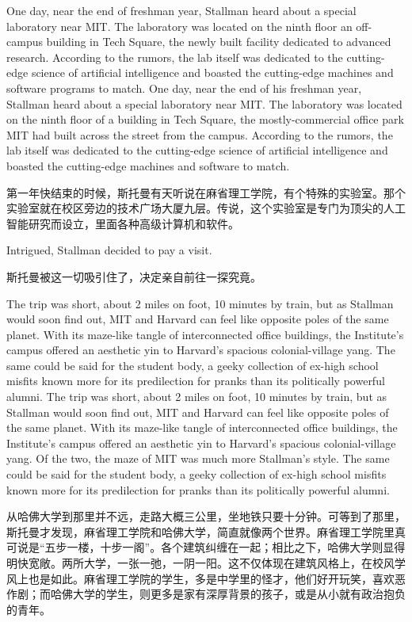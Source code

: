 \ifdefined\eng
\ifdefined\vone
One day, near the end of freshman year, Stallman heard about a special laboratory near MIT. The laboratory was located on the ninth floor an off-campus building in Tech Square, the newly built facility dedicated to advanced research. According to the rumors, the lab itself was dedicated to the cutting-edge science of artificial intelligence and boasted the cutting-edge machines and software programs to match.
\fi
\ifdefined\vtwo
One day, near the end of his freshman year, Stallman heard about a special laboratory near MIT. The laboratory was located on the ninth floor of a building in Tech Square, the mostly-commercial office park MIT had built across the street from the campus. According to the rumors, the lab itself was dedicated to the cutting-edge science of artificial intelligence and boasted the cutting-edge machines and software to match.
\fi
\fi

\ifdefined\chs
第一年快结束的时候，斯托曼有天听说在麻省理工学院，有个特殊的实验室。那个实验室就在校区旁边的技术广场大厦九层。传说，这个实验室是专门为顶尖的人工智能研究而设立，里面各种高级计算机和软件。
\fi

\ifdefined\eng
Intrigued, Stallman decided to pay a visit.
\fi

\ifdefined\chs
斯托曼被这一切吸引住了，决定亲自前往一探究竟。
\fi

\ifdefined\eng
\ifdefined\vone
The trip was short, about 2 miles on foot, 10 minutes by train, but as Stallman would soon find out, MIT and Harvard can feel like opposite poles of the same planet. With its maze-like tangle of interconnected office buildings, the Institute's campus offered an aesthetic yin to Harvard's spacious colonial-village yang. The same could be said for the student body, a geeky collection of ex-high school misfits known more for its predilection for pranks than its politically powerful alumni.
\fi
\ifdefined\vtwo
The trip was short, about 2 miles on foot, 10 minutes by train, but as Stallman would soon find out, MIT and Harvard can feel like opposite poles of the same planet. With its maze-like tangle of interconnected office buildings, the Institute's campus offered an aesthetic yin to Harvard's spacious colonial-village yang.  Of the two, the maze of MIT was much more Stallman's style. The same could be said for the student body, a geeky collection of ex-high school misfits known more for its predilection for pranks than its politically powerful alumni.
\fi
\fi

\ifdefined\chs
从哈佛大学到那里并不远，走路大概三公里，坐地铁只要十分钟。可等到了那里，斯托曼才发现，麻省理工学院和哈佛大学，简直就像两个世界。麻省理工学院里真可说是``五步一楼，十步一阁''。各个建筑纠缠在一起；相比之下，哈佛大学则显得明快宽敞。两所大学，一张一弛，一阴一阳。这不仅体现在建筑风格上，在校风学风上也是如此。麻省理工学院的学生，多是中学里的怪才，他们好开玩笑，喜欢恶作剧；而哈佛大学的学生，则更多是家有深厚背景的孩子，或是从小就有政治抱负的青年。
\fi

